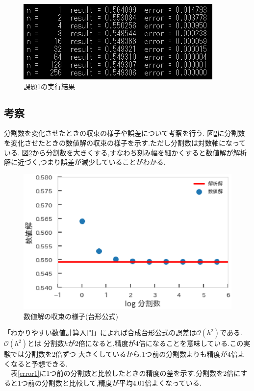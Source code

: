 \documentclass[dvipdfmx]{jarticle}
\begin{document}
    \begin{figure}[H]
      \centering
      \includegraphics[scale=0.9]{kadai1.png}
      \caption{課題1の実行結果}
       \label{result1}
      \end{figure}

    \subsection{考察}
    分割数を変化させたときの収束の様子や誤差について考察を行う.
    図\ref{fig1-1}に分割数を変化させたときの数値解の収束の様子を示す.ただし分割数は対数軸になっている.
    図\ref{fig1-1}から分割数を大きくする,すなわち刻み幅を細かくすると数値解が解析解に近づく,つまり誤差が減少していることがわかる.
    \begin{figure}[H]
      \centering
      \includegraphics[scale=0.7]{kadai1.eps}
      \caption{数値解の収束の様子(台形公式)}
       \label{fig1-1}
      \end{figure}
      「わかりやすい数値計算入門」\cite{wakari}によれば合成台形公式の誤差は$\mathcal{O}(h^2)$である.$\mathcal{O}(h^2)$とは
      分割数$h$が2倍になると,精度が4倍になることを意味している.この実験では分割数を$2$倍ずつ
      大きくしているから,1つ前の分割数よりも精度が4倍よくなると予想できる.\\
      　表\ref{error1}に1つ前の分割数と比較したときの精度の差を示す.分割数を2倍にすると1つ前の分割数と比較して,精度が平均4.01倍よくなっている.
\end{document}
